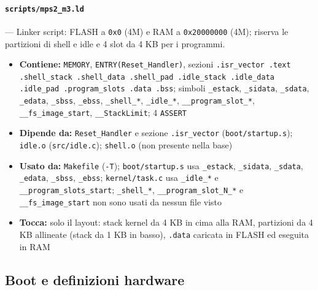 \paragraph{\texttt{scripts/mps2\_m3.ld}} --- Linker script: FLASH a \texttt{0x0} (4M) e RAM a \texttt{0x20000000} (4M); riserva le partizioni di shell e idle e 4 slot da 4 KB per i programmi.
\begin{itemize}
  \item \textbf{Contiene:} \texttt{MEMORY}, \texttt{ENTRY(Reset\_Handler)}, sezioni \texttt{.isr\_vector .text .shell\_stack .shell\_data .shell\_pad .idle\_stack .idle\_data .idle\_pad .program\_slots .data .bss}; simboli \texttt{\_estack}, \texttt{\_sidata}, \texttt{\_sdata}, \texttt{\_edata}, \texttt{\_sbss}, \texttt{\_ebss}, \texttt{\_shell\_*}, \texttt{\_idle\_*}, \texttt{\_\_program\_slot\_*}, \texttt{\_\_fs\_image\_start}, \texttt{\_\_StackLimit}; 4 \texttt{ASSERT}
  \item \textbf{Dipende da:} \texttt{Reset\_Handler} e sezione \texttt{.isr\_vector} (\texttt{boot/startup.s}); \texttt{idle.o} (\texttt{src/idle.c}); \texttt{shell.o} (non presente nella base)
  \item \textbf{Usato da:} \texttt{Makefile} (\texttt{-T}); \texttt{boot/startup.s} usa \texttt{\_estack}, \texttt{\_sidata}, \texttt{\_sdata}, \texttt{\_edata}, \texttt{\_sbss}, \texttt{\_ebss}; \texttt{kernel/task.c} usa \texttt{\_idle\_*} e \texttt{\_\_program\_slots\_start}; \texttt{\_shell\_*}, \texttt{\_\_program\_slot\_N\_*} e \texttt{\_\_fs\_image\_start} non sono usati da nessun file visto
  \item \textbf{Tocca:} solo il layout: stack kernel da 4 KB in cima alla RAM, partizioni da 4 KB allineate (stack da 1 KB in basso), \texttt{.data} caricata in FLASH ed eseguita in RAM
\end{itemize}

\subsection{Boot e definizioni hardware}

